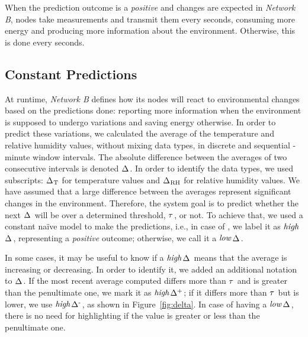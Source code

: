 \documentclass{llncs}
\newcommand{\ourDelta}[2][]{\ensuremath{\Delta\textsuperscript{\text{#1}}
\textsubscript{\text{#2}}}}
\newcommand{\high}[1][ ]{\ensuremath{\text{\emph{high}}#1}}
\newcommand{\low}[1][ ]{\ensuremath{\text{\emph{low}}#1}}
\newcommand{\highDelta}[2][]{\high{\ourDelta[#1]{#2}}}
\newcommand{\lowDelta}[2][]{\low{\ourDelta[#1]{#2}}}
\newcommand{\threshold}[1][]{\ensuremath{\tau\textsubscript{#1}}}
\begin{document}
When the prediction outcome is a \emph{positive} and changes are expected in 
\emph{Network B}, nodes take measurements and transmit them every  seconds, 
consuming more energy and producing more information about the environment. 
Otherwise, this is done every  seconds.

\subsection{Constant Predictions}
\label{sec:system-goal-definition}

At runtime, \emph{Network B} defines how its nodes will react to environmental 
changes based on the predictions done: reporting more information when the 
environment is supposed to undergo variations and saving energy otherwise.
In order to predict these variations, we calculated the average of the 
temperature and relative humidity values, without mixing data types, in 
discrete and sequential -minute window intervals. The absolute difference 
between the averages of two consecutive intervals is denoted \ourDelta{}.
In order to identify the data types, we used subscripts: \ourDelta{T} 
for temperature values and \ourDelta{RH} for relative humidity values.
We have assumed that a large difference between the averages 
represent significant changes in the environment.
Therefore, the system goal is to predict whether the next \ourDelta{} will be 
over a determined threshold, \threshold{}, or not. 
To achieve that, we used a constant na\"ive model to make the predictions, 
i.e., in case of , we label it as \highDelta{}, 
representing a \emph{positive} outcome; 
otherwise, we call it a \lowDelta{}. 

In some cases, it may be useful to know if a \highDelta{} means that the 
average is increasing or decreasing. In order to identify it, we added an 
additional notation to \ourDelta{}. If the most recent average computed 
differs more than \threshold{} and is greater 
than the penultimate one, we mark it as \highDelta[+]{}; 
if it differs more than \threshold{} but is lower, we use 
\highDelta[-]{}, as shown in Figure~\ref{fig:delta}.
In case of having a \lowDelta{}, there is no need for highlighting if the value 
is greater or less than the penultimate one.
\end{document}
